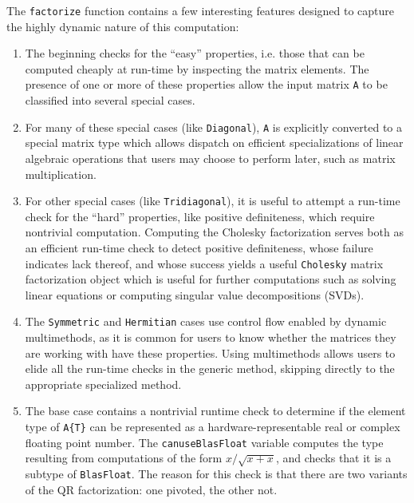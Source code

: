 \documentclass[10pt, preprint]{sigplanconf}
\begin{document}
The \verb|factorize| function contains a few interesting features
designed to capture the highly dynamic nature of this computation:

\begin{enumerate}
\item The beginning checks for the ``easy'' properties, i.e.  those that can be
	computed cheaply at run-time by inspecting the matrix elements. The
	presence of one or more of these properties allow the input matrix
	\verb|A| to be classified into several special cases.

\item For many of these special cases (like \verb|Diagonal|), \verb|A| is
	explicitly converted to a special matrix type which allows dispatch on
	efficient specializations of linear algebraic operations that users may
	choose to perform later, such as matrix multiplication.

\item For other special cases (like \verb|Tridiagonal|), it is useful to
	attempt a run-time check for the ``hard'' properties, like positive
	definiteness, which require nontrivial computation. Computing the
	Cholesky factorization serves both as an efficient run-time check to
	detect positive definiteness, whose failure indicates lack thereof, and
	whose success yields a useful \verb|Cholesky| matrix factorization
	object which is useful for further computations such as solving linear
	equations or computing singular value decompositions (SVDs).

\item The \verb|Symmetric| and \verb|Hermitian| cases use control flow
	enabled by dynamic multimethods, as it is common for users to know
	whether the matrices they are working with have these properties.
	Using multimethods allows users to elide all the run-time checks
	in the generic method, skipping directly to the appropriate specialized
	method.

\item The base case contains a nontrivial runtime check to determine if the
	element type of \verb|A{T}| can be represented as a
	hardware-representable real or complex floating point number. The
	\verb|canuseBlasFloat| variable computes the type resulting from
	computations of the form $x / \sqrt{x + x}$, and checks that it is a
	subtype of \verb|BlasFloat|. The reason for this check is that there
	are two variants of the QR factorization: one pivoted, the other not.

\end{enumerate}
\end{document}
